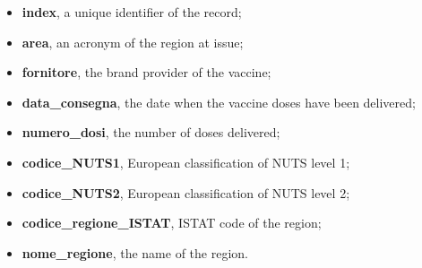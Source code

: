 \documentclass{article}
\begin{document}
\begin{itemize}
    \item \textbf{index}, a unique identifier of the record;
    \item \textbf{area}, an acronym of the region at issue;
    \item \textbf{fornitore}, the brand provider of the vaccine; 
    \item \textbf{data\_consegna}, the date when the vaccine doses have been delivered;
    \item \textbf{numero\_dosi}, the number of doses delivered;
    \item \textbf{codice\_NUTS1}, European classification of NUTS level 1;
    \item \textbf{codice\_NUTS2}, European classification of NUTS level 2;
    \item \textbf{codice\_regione\_ISTAT}, ISTAT code of the region;
    \item \textbf{nome\_regione}, the name of the region.
\end{itemize}
\newpage

\end{document}
